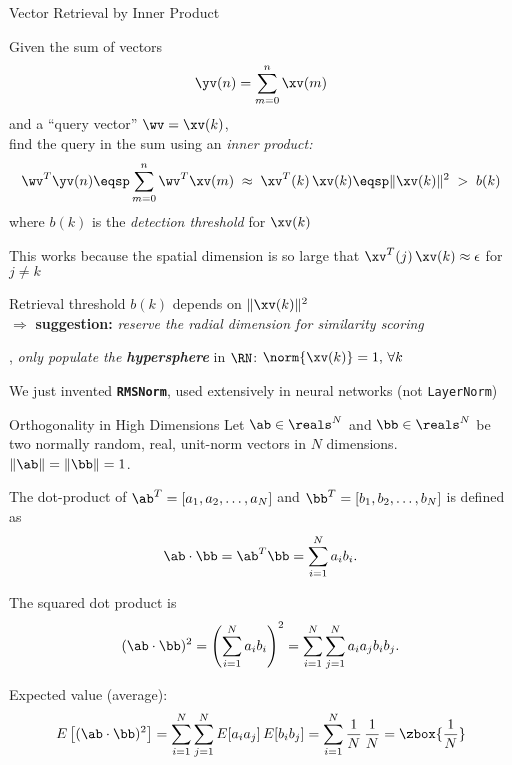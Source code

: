 \begin{slide}[\slideopts,toc={Inner Product}]{Vector Retrieval by Inner Product}

  Given the sum of vectors
  \[
  \yv(n) = \sum_{m=0}^n \xv(m)
  \]
  and a ``query vector'' $\wv = \xv(k)$,\\
  \maybepause
  find the query in the sum using an \emph{inner product:}
  \[
  \wv^T\yv(n) \eqsp \sum_{m=0}^n \wv^T\xv(m) \;\approx\; \xv^T(k)\,\xv(k) \eqsp \|\xv(k)\|^2 \;>\; b(k)
  \]
  where $b(k)$ is the \emph{detection threshold} for $\xv(k)$

  \begin{itemize}
  \mpitem This works because the spatial dimension is so large that $\xv^T(j)\,\xv(k)\approx \epsilon$ for $j\ne k$

  \mpitem Retrieval threshold $b(k)$ depends on $\|\xv(k)\|^2$\\
  $\Rightarrow$ \textbf{suggestion:} \emph{reserve the radial dimension for similarity scoring}

  \mpitem \Ie, \emph{only populate the \textbf{hypersphere}} in $\RN$: $\norm{\xv(k)} = 1, \, \forall k$

  \mpitem We just invented \textbf{\texttt{RMSNorm}}, used extensively in neural networks (not \texttt{LayerNorm})

  \end{itemize}

\end{slide}


\begin{slide}[\slideopts,toc={Orthogonality}]{Orthogonality in High Dimensions}
\vspace{-1em}
% 
Let $\ab\in\reals^N$ and $\bb\in\reals^N$ be two normally random, real, unit-norm vectors in $N$ dimensions.
$\|\ab\|=\|\bb\|=1$.

The dot-product of
$\ab^T=[a_1,a_2,\ldots,a_N]$ and
$\bb^T=[b_1,b_2,\ldots,b_N]$ is defined as
\[
\ab \cdot \bb = \ab^T\bb = \sum_{i=1}^{N} a_i b_i.
\]

The squared dot product is
\[
(\ab \cdot \bb)^2 = \left(\sum_{i=1}^{N} a_i b_i\right)^2 = \sum_{i=1}^{N} \sum_{j=1}^{N} a_i a_j b_i b_j.
\]

Expected value (average):
\[
E\left[(\ab \cdot \bb)^2\right]
= \sum_{i=1}^{N} \sum_{j=1}^{N} E[a_i a_j] \, E[b_i b_j]
= \sum_{i=1}^{N} \frac{1}{N}\,\frac{1}{N}
= \zbox{\frac{1}{N}}
\]
\end{slide}

